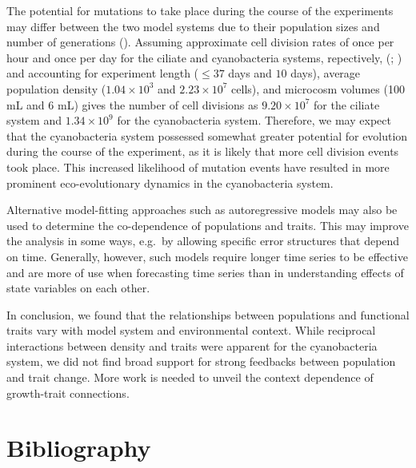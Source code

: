 \documentclass[
  letterpaper,
  DIV=11,
  numbers=noendperiod]{scrartcl}
\begin{document}
The potential for mutations to take place during the course of the
experiments may differ between the two model systems due to their
population sizes and number of generations
(). Assuming
approximate cell division rates of once per hour and once per day for
the ciliate and cyanobacteria systems, repectively,
(;
) and accounting for
experiment length (\(\leq 37\) days and \(10\) days), average population
density (\(1.04 \times 10^{3}\) and \(2.23 \times 10^{7}\) cells), and
microcosm volumes (100 mL and 6 mL) gives the number of cell divisions
as \(9.20 \times 10^{7}\) for the ciliate system and
\(1.34 \times 10^{9}\) for the cyanobacteria system. Therefore, we may
expect that the cyanobacteria system possessed somewhat greater
potential for evolution during the course of the experiment, as it is
likely that more cell division events took place. This increased
likelihood of mutation events have resulted in more prominent
eco-evolutionary dynamics in the cyanobacteria system.

Alternative model-fitting approaches such as autoregressive models may
also be used to determine the co-dependence of populations and traits.
This may improve the analysis in some ways, e.g.~by allowing specific
error structures that depend on time. Generally, however, such models
require longer time series to be effective and are more of use when
forecasting time series than in understanding effects of state variables
on each other.

In conclusion, we found that the relationships between populations and
functional traits vary with model system and environmental context.
While reciprocal interactions between density and traits were apparent
for the cyanobacteria system, we did not find broad support for strong
feedbacks between population and trait change. More work is needed to
unveil the context dependence of growth-trait connections.

\section*{Bibliography}\label{bibliography}
\end{document}

